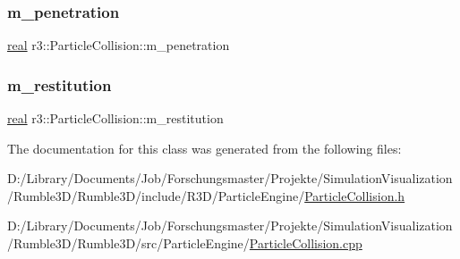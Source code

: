\subsubsection{\texorpdfstring{m\+\_\+penetration}{m\_penetration}}
{\footnotesize\ttfamily \mbox{\hyperlink{namespacer3_ab2016b3e3f743fb735afce242f0dc1eb}{real}} r3\+::\+Particle\+Collision\+::m\+\_\+penetration\hspace{0.3cm}{\ttfamily [protected]}}

\mbox{\label{classr3_1_1_particle_collision_a02dd7e5f227a429bcb707ad46adeb292}} 
\subsubsection{\texorpdfstring{m\+\_\+restitution}{m\_restitution}}
{\footnotesize\ttfamily \mbox{\hyperlink{namespacer3_ab2016b3e3f743fb735afce242f0dc1eb}{real}} r3\+::\+Particle\+Collision\+::m\+\_\+restitution\hspace{0.3cm}{\ttfamily [protected]}}



The documentation for this class was generated from the following files\+:\begin{DoxyCompactItemize}
\item 
D\+:/\+Library/\+Documents/\+Job/\+Forschungsmaster/\+Projekte/\+Simulation\+Visualization/\+Rumble3\+D/\+Rumble3\+D/include/\+R3\+D/\+Particle\+Engine/\mbox{\hyperlink{_particle_collision_8h}{Particle\+Collision.\+h}}\item 
D\+:/\+Library/\+Documents/\+Job/\+Forschungsmaster/\+Projekte/\+Simulation\+Visualization/\+Rumble3\+D/\+Rumble3\+D/src/\+Particle\+Engine/\mbox{\hyperlink{_particle_collision_8cpp}{Particle\+Collision.\+cpp}}\end{DoxyCompactItemize}
